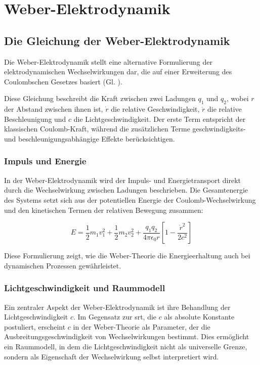 \chapter{Weber-Elektrodynamik}
\section{Die Gleichung der Weber-Elektrodynamik}
\label{sec:weber_em}
Die Weber-Elektrodynamik stellt eine alternative Formulierung der elektrodynamischen Wechselwirkungen dar, die auf einer Erweiterung des Coulombschen Gesetzes basiert (Gl. ).

Diese Gleichung beschreibt die Kraft zwischen zwei Ladungen $q_1$ und $q_2$, wobei $r$ der Abstand zwischen ihnen ist, $\dot{r}$ die relative Geschwindigkeit, $\ddot{r}$ die relative
Beschleunigung und $c$ die Lichtgeschwindigkeit. Der erste Term entspricht der klassischen Coulomb-Kraft, während die zusätzlichen Terme geschwindigkeits- und beschleunigungsabhängige
Effekte berücksichtigen.

\subsection{Impuls und Energie}
In der Weber-Elektrodynamik wird der Impuls- und Energietransport direkt durch die Wechselwirkung zwischen Ladungen beschrieben. Die Gesamtenergie des Systems setzt sich aus der potentiellen
Energie der Coulomb-Wechselwirkung und den kinetischen Termen der relativen Bewegung zusammen:

\begin{equation}
    E = \frac{1}{2} m_1 v_1^2 + \frac{1}{2} m_2 v_2^2 + \frac{q_1 q_2}{4 \pi \epsilon_0 r} \left[ 1 - \frac{\dot{r}^2}{2c^2} \right]    
\end{equation}

Diese Formulierung zeigt, wie die Weber-Theorie die Energieerhaltung auch bei dynamischen Prozessen gewährleistet.

\subsection{Lichtgeschwindigkeit und Raummodell}
Ein zentraler Aspekt der Weber-Elektrodynamik ist ihre Behandlung der Lichtgeschwindigkeit $c$. Im Gegensatz zur \gls{srt}, die $c$ als absolute Konstante postuliert,
erscheint $c$ in der Weber-Theorie als Parameter, der die Ausbreitungsgeschwindigkeit von Wechselwirkungen bestimmt. Dies ermöglicht ein Raummodell, in dem die Lichtgeschwindigkeit
nicht als universelle Grenze, sondern als Eigenschaft der Wechselwirkung selbst interpretiert wird.

